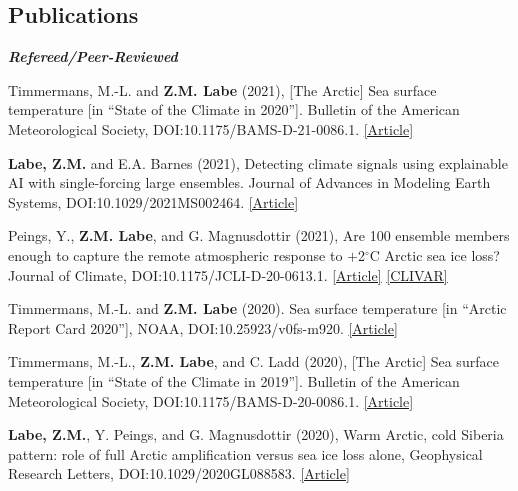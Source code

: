 \documentclass[margin,line,palatino,courier,10pt]{res}
\begin{document}
\begin{resume}
\section{\sc \large{\textcolor{Cerulean}{\textbf{Publications}}}} 
\textit{\textbf{Refereed/Peer-Reviewed}}
\vspace*{-0.1in}\\
\begin{etaremune}[leftmargin=0in,topsep=0in,parsep=0in]
\item Timmermans, M.-L. and \textbf{Z.M. Labe} (2021), [The Arctic] Sea surface temperature [in ``State of the Climate in 2020'']. Bulletin of the American Meteorological Society, DOI:10.1175/BAMS-D-21-0086.1. \href{https://journals.ametsoc.org/view/journals/bams/102/8/BAMS-D-21-0086.1.xml}{[Article]}
\item \textbf{Labe, Z.M.} and E.A. Barnes (2021), Detecting climate signals using explainable AI with single-forcing large ensembles. Journal of Advances in Modeling Earth Systems, DOI:10.1029/2021MS002464. \href{https://agupubs.onlinelibrary.wiley.com/doi/abs/10.1029/2021MS002464}{[Article]}
\item Peings, Y., \textbf{Z.M. Labe}, and G. Magnusdottir (2021), Are 100 ensemble members enough to capture the remote atmospheric response to $+$2$^{\circ}$C Arctic sea ice loss? Journal of Climate, DOI:10.1175/JCLI-D-20-0613.1. \href{https://journals.ametsoc.org/view/journals/clim/aop/JCLI-D-20-0613.1/JCLI-D-20-0613.1.xml}{[Article]} \href{https://usclivar.org/research-highlights/how-reproducible-response-2degc-arctic-sea-ice-loss-large-ensemble-simulations}{[CLIVAR]}
\item Timmermans, M.-L. and \textbf{Z.M. Labe} (2020). Sea surface temperature [in ``Arctic Report Card 2020''], NOAA, DOI:10.25923/v0fs-m920. \href{https://arctic.noaa.gov/Report-Card/Report-Card-2020/ArtMID/7975/ArticleID/885/Sea-Surface-Temperature}{[Article]}
\item Timmermans, M.-L., \textbf{Z.M. Labe}, and C. Ladd (2020), [The Arctic] Sea surface temperature [in ``State of the Climate in 2019'']. Bulletin of the American Meteorological Society, DOI:10.1175/BAMS-D-20-0086.1. \href{https://journals.ametsoc.org/bams/article/101/8/S239/353884/The-Arctic}{[Article]}
\item \textbf{Labe, Z.M.}, Y. Peings, and G. Magnusdottir (2020), Warm Arctic, cold Siberia pattern: role of full Arctic amplification versus sea ice loss alone, Geophysical Research Letters, DOI:10.1029/2020GL088583. \href{https://agupubs.onlinelibrary.wiley.com/doi/10.1029/2020GL088583}{[Article]}

\end{etaremune}
\end{resume}
\end{document}
